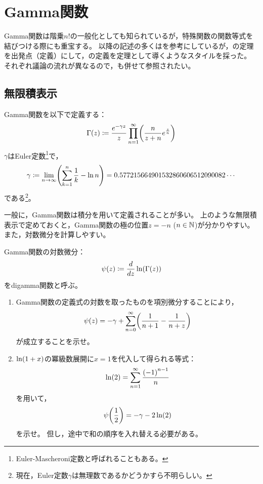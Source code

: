 \documentclass[a4paper,draft]{ltjsarticle}
\begin{document}
\section{Gamma関数}\label{sec:gamma}
Gamma関数は階乗$n!$の一般化としても知られているが，特殊関数の関数等式を結びつける際にも重宝する。
以降の記述の多くは\cite{nkswtr}を参考にしているが，\cite{nkswtr}の定理を出発点（定義）にして，\cite{nkswtr}の定義を定理として導くようなスタイルを採った。
それぞれ議論の流れが異なるので，\cite{nkswtr}も併せて参照されたい。

\subsection{無限積表示}
\begin{defi}[Gamma関数]
    Gamma関数を以下で定義する：
    \begin{equation}
        \fun{\Gamma}{z}\coloneqq \dfrac{e^{-\gamma z}}{z}\prod_{n=1}^\infty\pare{\dfrac{n}{z+n}e^{\frac{z}{n}}}
    \end{equation}
    $\gamma$はEuler定数\footnote{Euler-Mascheroni定数と呼ばれることもある。}で，
    \begin{equation}
        \gamma\coloneqq \limn\pare{\sum_{k=1}^n\dfrac{1}{k}-\ln n}=0.577215664901532860606512090082\cdots
    \end{equation}
    である\footnote{現在，Euler定数$\gamma$は無理数であるかどうかすら不明らしい。}。
\end{defi}

一般に，Gamma関数は積分を用いて定義されることが多い。
上のような無限積表示で定めておくと，Gamma関数の極の位置$z=-n$ ($n\in\mathbb{N}$)が分かりやすい。
また，対数微分を計算しやすい。

\begin{prob}\label{prob-gamma:digamma1}
    Gamma関数の対数微分：
    \begin{equation}
        \fun{\psi}{z}\coloneqq \diff{}{z}\fun{\ln}{\fun{\Gamma}{z}}
    \end{equation}
    をdigamma関数と呼ぶ。
    \begin{enumerate}[label=(\arabic*)]
        \item Gamma関数の定義式の対数を取ったものを項別微分することにより，
        \begin{equation}
            \fun{\psi}{z}=-\gamma+\sum_{n=0}^\infty \pare{\frac{1}{n+1}-\frac{1}{n+z}}
        \end{equation}
        が成立することを示せ。

        \item $\fun{\ln}{1+x}$の冪級数展開に$x=1$を代入して得られる等式：
        \begin{equation}
            \fun{\ln}{2}=\sum_{n=1}^\infty \frac{\pare{-1}^{n-1}}{n}
        \end{equation}
        を用いて，
        \begin{equation}
            \fun{\psi}{\frac{1}{2}}=-\gamma-2\fun{\ln}{2}
        \end{equation}
        を示せ。
        但し，途中で和の順序を入れ替える必要がある。
    \end{enumerate}
\end{prob}
\end{document}
